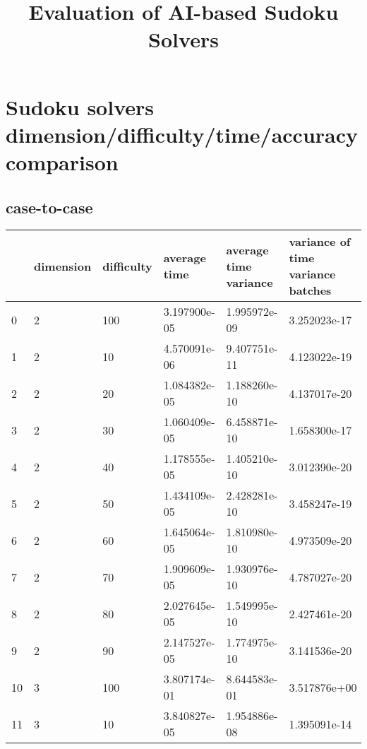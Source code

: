 \documentclass{article}
\title{Evaluation of AI-based Sudoku Solvers}
\begin{document}
\maketitle
\date{}
\section{Sudoku solvers dimension/difficulty/time/accuracy comparison}
\subsection{case-to-case}
\begin{center}
\begin{tabular}{llllll}
\toprule
{} & dimension & difficulty &  average time & average time variance & variance of time variance batches \\
\midrule
0  &         2 &        100 &  3.197900e-05 &          1.995972e-09 &                      3.252023e-17 \\
1  &         2 &         10 &  4.570091e-06 &          9.407751e-11 &                      4.123022e-19 \\
2  &         2 &         20 &  1.084382e-05 &          1.188260e-10 &                      4.137017e-20 \\
3  &         2 &         30 &  1.060409e-05 &          6.458871e-10 &                      1.658300e-17 \\
4  &         2 &         40 &  1.178555e-05 &          1.405210e-10 &                      3.012390e-20 \\
5  &         2 &         50 &  1.434109e-05 &          2.428281e-10 &                      3.458247e-19 \\
6  &         2 &         60 &  1.645064e-05 &          1.810980e-10 &                      4.973509e-20 \\
7  &         2 &         70 &  1.909609e-05 &          1.930976e-10 &                      4.787027e-20 \\
8  &         2 &         80 &  2.027645e-05 &          1.549995e-10 &                      2.427461e-20 \\
9  &         2 &         90 &  2.147527e-05 &          1.774975e-10 &                      3.141536e-20 \\
10 &         3 &        100 &  3.807174e-01 &          8.644583e-01 &                      3.517876e+00 \\
11 &         3 &         10 &  3.840827e-05 &          1.954886e-08 &                      1.395091e-14 \\

\end{tabular}
\end{center}
\end{document}

